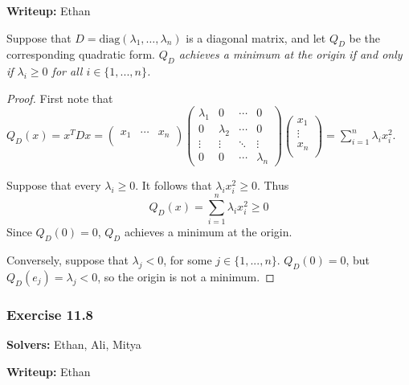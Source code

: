 \documentclass{article}
\theoremstyle{plain} %
\numberwithin{thm}{section} %
\theoremstyle{definition}
\begin{document}
    \noindent\textbf{Writeup:} Ethan

    Suppose that $D=\mathrm{diag}(\lambda_1,\ldots,\lambda_n)$ is a diagonal matrix, and let $Q_D$ be the corresponding quadratic form. \textit{$Q_D$ achieves a minimum at the origin if and only if \(\lambda _i \geq 0\) for all \(i \in \{1, ..., n\}\).}

    \begin{proof}
        First note that \(Q_D(x) = x^T D x = \begin{pmatrix}
            x_1 & \cdots &  x_n \\
        \end{pmatrix}
        \begin{pmatrix}
            \lambda _1 & 0 & \cdots & 0 \\
            0 & \lambda_2 & \cdots & 0 \\
            \vdots & \vdots & \ddots & \vdots  \\
            0 & 0 & \cdots & \lambda_n
        \end{pmatrix}
        \begin{pmatrix}
             x_1 \\
             \vdots \\
             x_n \\
        \end{pmatrix}
        = \sum\limits_{i=1}^n \lambda_i x_i^2\).
        
        Suppose that every \(\lambda _i \geq 0\). It follows that \(\lambda _i x_i^2 \geq 0\). Thus
        \[
            Q_D(x) = \sum_{i=1}^n \lambda_i x_i^2 \geq 0
        \]
        Since \(Q_D(0) = 0\), \(Q_D\) achieves a minimum at the origin.

        Conversely, suppose that \(\lambda_j < 0\), for some \(j \in \{1, ..., n\}\). \(Q_D(0) = 0\), but \(Q_D(e_j) = \lambda_j < 0\), so the origin is not a minimum.
        \smallbreak
    \end{proof}
    \subsubsection{Exercise 11.8}
    \textbf{Solvers:} Ethan, Ali, Mitya

    \noindent\textbf{Writeup:} Ethan
\end{document}
